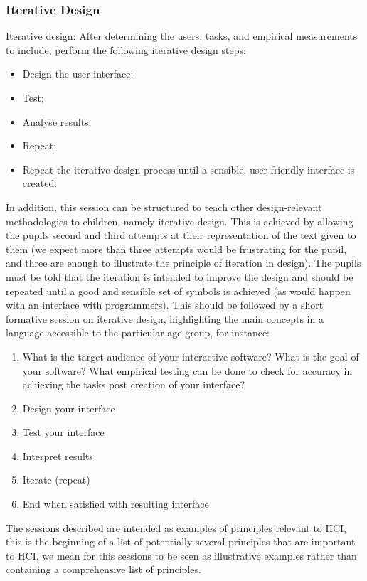 \documentclass{sig-alternate}
\begin{document}
\subsubsection*{Iterative Design}

Iterative design: After determining the users, tasks, and empirical
measurements to include, perform the following iterative design steps:

\begin{itemize}
\item Design the user interface; 
\item Test;
\item Analyse results;
\item Repeat;
\item Repeat the iterative design process until a sensible, user-friendly interface is
created.
\end{itemize}

In addition, this session can be structured to teach other
design-relevant methodologies to children, namely iterative
design. This is achieved by allowing the pupils second and third
attempts at their representation of the text given to them (we expect
more than three attempts would be frustrating for the pupil, and three
are enough to illustrate the principle of iteration in design). The
pupils must be told that the iteration is intended to improve the
design and should be repeated until a good and sensible set of symbols
is achieved (as would happen with an interface with programmers). This
should be followed by a short formative session on iterative design,
highlighting the main concepts in a language accessible to the
particular age group, for instance:

\begin{enumerate}
\item What is the target audience of your interactive software? What
  is the goal of your software? What empirical testing can be done to
  check for accuracy in achieving the tasks post creation of your
  interface?
\item Design your interface 
\item Test your interface
\item Interpret results
\item Iterate (repeat)
\item End when satisfied with resulting interface
\end{enumerate}

The sessions described are intended as examples of principles relevant
to HCI, this is the beginning of a list of potentially several
principles that are important to HCI, we mean for this sessions to be
seen as illustrative examples rather than containing a comprehensive
list of principles.
\end{document}
